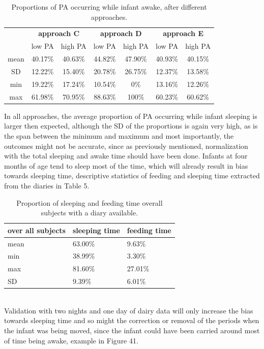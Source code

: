 \documentclass{article}
\begin{document}
{\begin{table}[h!]
\centering
\label{my-label}
\begin{tabular}{|c|c|c|c|c|c|c|}
\hline
\multirow{2}{}{} & \multicolumn{2}{c|}{\textbf{approach C}} & \multicolumn{2}{c|}{\textbf{approach D}} & \multicolumn{2}{c|}{\textbf{approach E}} \\ \cline{2-7} 
 & low PA & high PA & low PA & high PA & low PA & high PA \\ \hline
mean & 40.17\% & 40.63\% & 44.82\% & 47.90\% & 40.93\% & 40.15\% \\ \hline
SD & 12.22\% & 15.40\% & 20.78\% & 26.75\% & 12.37\% & 13.58\% \\ \hline
min & 19.22\% & 17.24\% & 10.54\% & 0\% & 13.16\% & 12.26\% \\ \hline
max & 61.98\% & 70.95\% & 88.63\% & 100\% & 60.23\% & 60.62\% \\ \hline
\end{tabular}
\caption{Proportions of PA occurring while infant awake, after different approaches.}
\end{table}
\newpage
In all approaches, the average proportion of PA occurring while infant sleeping is larger then expected, although the SD of the proportions is again very high, as is the span between the minimum and maximum and most importantly, the outcomes might not be accurate, since as previously mentioned, normalization with the total sleeping and awake time should have been done. Infants at four months of age tend to sleep most of the time, which will already result in bias towards sleeping time, descriptive statistics of feeding and sleeping time extracted from the diaries in Table 5. 
\begin{table}[h!]
\centering
\begin{tabular}{|l|l|l|}
\hline
over all subjects & sleeping time & feeding time \\ \hline
mean   & 63.00\%  & 9.63\%  \\ \hline
min   & 38.99\%  & 3.30\%  \\ \hline
max   & 81.60\%  & 27.01\% \\ \hline
SD   & 9.39\%  & 6.01\%  \\ \hline
\end{tabular}
\caption{Proportion of sleeping and feeding time overall subjects with a diary available.}
\end{table}
\\Validation with two nights and one day of dairy data will only increase the bias towards sleeping time and so might the correction or removal of the periods when the infant was being moved, since the infant could have been carried around most of time being awake, example in Figure 41.
}
\end{document}

